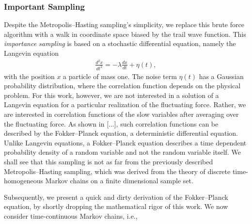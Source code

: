 \documentclass[11pt,a4paper]{article}
\numberwithin{equation}{section}
\begin{document}
\subsubsection{Important Sampling}
%
%
Despite the Metropolis--Hasting sampling's simplicity, we replace this brute force algorithm with a walk in coordinate space biased by the trail wave function. 
%
This {\it importance sampling} is based on a stochastic differential equation, namely the Langevin equation
\begin{align*}
\frac{d^{2}x}{dt^{2}}=-\lambda \frac{dx}{dt}+\eta\left( t\right),
\end{align*}
with the position ${x}$ a particle of mass one. 
%
The noise term $\eta \left(t\right)$ has a Gaussian probability distribution, where the correlation function depends on the physical problem. 
%
For this work, however, we are not interested in a solution of a Langevin equation for a particular realization of the fluctuating force.
%
Rather, we are interested in correlation functions of the slow variables after averaging over the fluctuating force. 
%
As shown in [...], such correlation functions can be described by the Fokker--Planck equation, a deterministic differential equation. 
%
Unlike Langevin equations, a Fokker--Planck equation describes a time dependent probability density of a random variable and not the random variable itself.
%
We shall see that this sampling is not as far from the previously described  Metropolis--Hasting sampling, which was derived from the theory of discrete time-homogeneous Markov chains on a finite dimensional sample set.

%
Subsequently, we present a quick and dirty derivation of the Fokker--Planck equation, by shortly dropping the mathematical rigor of this work. 
%
We now consider time-continuous Markov chains, i.e.,
\end{document}
